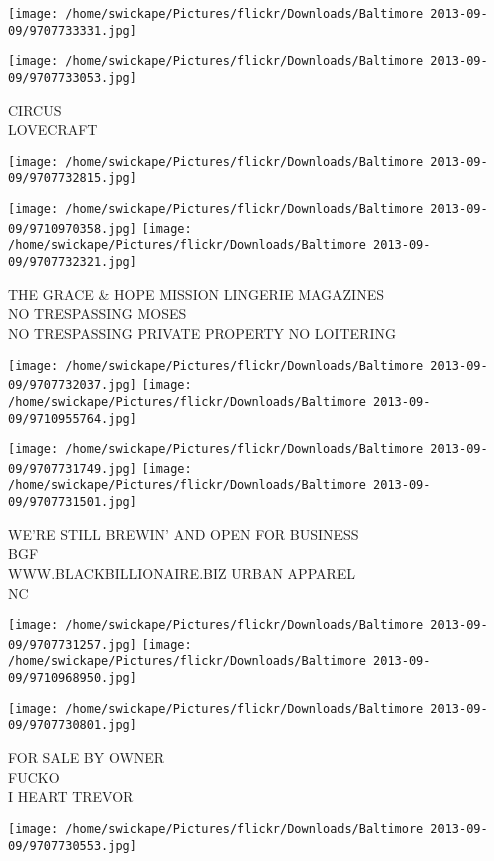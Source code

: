 \documentclass[10pt,letterpaper]{article}
\begin{document}
\texttt{[image: /home/swickape/Pictures/flickr/Downloads/Baltimore 2013-09-09/9707733331.jpg]}

\vspace{0.25in}
\texttt{[image: /home/swickape/Pictures/flickr/Downloads/Baltimore 2013-09-09/9707733053.jpg]}

CIRCUS\\
LOVECRAFT
\pagebreak

\texttt{[image: /home/swickape/Pictures/flickr/Downloads/Baltimore 2013-09-09/9707732815.jpg]}

\vspace{0.25in}
\texttt{[image: /home/swickape/Pictures/flickr/Downloads/Baltimore 2013-09-09/9710970358.jpg]}
\texttt{[image: /home/swickape/Pictures/flickr/Downloads/Baltimore 2013-09-09/9707732321.jpg]}

THE GRACE \& HOPE MISSION LINGERIE MAGAZINES\\
NO TRESPASSING MOSES\\
NO TRESPASSING PRIVATE PROPERTY NO LOITERING
\pagebreak

\texttt{[image: /home/swickape/Pictures/flickr/Downloads/Baltimore 2013-09-09/9707732037.jpg]}
\texttt{[image: /home/swickape/Pictures/flickr/Downloads/Baltimore 2013-09-09/9710955764.jpg]}

\texttt{[image: /home/swickape/Pictures/flickr/Downloads/Baltimore 2013-09-09/9707731749.jpg]}
\texttt{[image: /home/swickape/Pictures/flickr/Downloads/Baltimore 2013-09-09/9707731501.jpg]}

WE'RE STILL BREWIN' AND OPEN FOR BUSINESS\\
BGF\\
WWW.BLACKBILLIONAIRE.BIZ URBAN APPAREL\\
NC
\pagebreak

\texttt{[image: /home/swickape/Pictures/flickr/Downloads/Baltimore 2013-09-09/9707731257.jpg]}
\texttt{[image: /home/swickape/Pictures/flickr/Downloads/Baltimore 2013-09-09/9710968950.jpg]}

\texttt{[image: /home/swickape/Pictures/flickr/Downloads/Baltimore 2013-09-09/9707730801.jpg]}

FOR SALE BY OWNER\\
FUCKO\\
I HEART TREVOR
\pagebreak

\texttt{[image: /home/swickape/Pictures/flickr/Downloads/Baltimore 2013-09-09/9707730553.jpg]}
\end{document}
